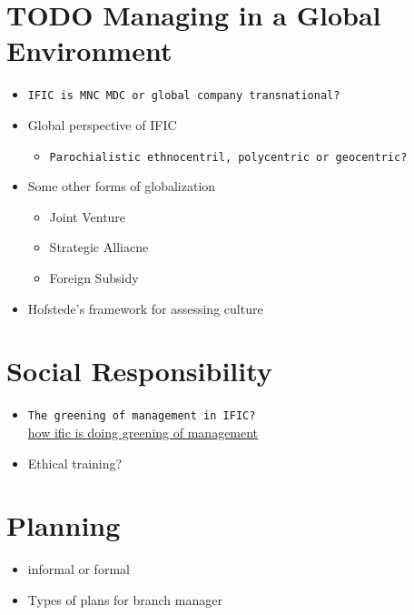 \documentclass[11pt]{article}
\begin{document}
\section{{\bfseries\sffamily TODO} Managing in a Global Environment}
\label{sec:orge934ab9}
\begin{itemize}
\item \texttt{IFIC is MNC MDC or global company transnational?}\\
\item Global perspective of IFIC\\
\begin{itemize}
\item \texttt{Parochialistic ethnocentril, polycentric or geocentric?}\\
\end{itemize}
\item Some other forms of globalization\\
\begin{itemize}
\item Joint Venture\\
\item Strategic Alliacne\\
\item Foreign Subsidy\\
\end{itemize}
\item Hofstede's framework for assessing culture\\
\end{itemize}
\section{Social Responsibility}
\label{sec:org3eef9b7}
\begin{itemize}
\item \texttt{The greening of management in IFIC?}\\
\href{https://www.ificbank.com.bd/business/sustainable-finance}{how ific is doing greening of management}\\
\item Ethical training?\\
\end{itemize}
\section{Planning}
\label{sec:orgc263d5f}
\begin{itemize}
\item informal or formal\\
\item Types of plans for branch manager\\
\end{itemize}
\end{document}
